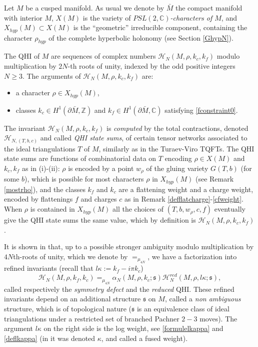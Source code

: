 \documentclass[11pt]{amsart}
\newcommand{\mc}{\mathbb{C}}
\newcommand{\mz}{\mathbb{Z}}
\newcommand{\Hh}{{\mathcal H}}
\begin{document}
{Let $M$ be a cusped manifold. As usual we denote by $\bar{M}$ the compact manifold with interior $M$, $X(M)$ is the variety of {\it $PSL(2,\mc)$-characters of $M$}, and $X_{hyp}(M) \subset X(M)$ is the ``geometric'' irreducible component, containing the character $\rho_{hyp}$ of the complete hyperbolic holonomy (see Section \ref{GhypN}).

The QHI of $M$ are sequences of complex numbers $\Hh_N(M, \rho,k_c,k_f)$ modulo multiplication by $2N$-th roots of unity, indexed by the odd positive integers $N\geq 3$. The arguments of $\Hh_N(M, \rho,k_c,k_f)$ are:
\begin{itemize}
	\item[(i)] a character $\rho\in X_{hyp}(M)$, 
	\item[(ii)] classes $k_c\in H^1(\partial \bar{M},\mz)$ and $k_f\in H^1(\partial \bar{M},\mc)$ satisfying \eqref{fconstraint0}. 
\end{itemize}
The invariant $\Hh_N(M, \rho,k_c,k_f)$ is {\it computed} by the total contractions, denoted $\Hh_{N, (T,b,c)}$ and called {\it QHI state sums},  of certain tensor networks associated to the ideal triangulations $T$ of $M$, similarly as in the Turaev-Viro TQFTs. The QHI state sums are functions of combinatorial data on $T$ encoding $\rho\in X(M)$ and $k_c,k_f$ as in (i)-(ii): $\rho$ is encoded by a point $w_\rho$ of the gluing variety $G(T,b)$ (for some $b$), which is possible for most characters $\rho$ in $X_{hyp}(M)$ (see Remark \ref{mostrho}), and the classes $k_f$ and $k_c$ are a flattening weight and a charge weight, encoded by flattenings $f$ and charges $c$ as in Remark \ref{defflatcharge}-\ref{cfweight}. When $\rho$ is contained in $X_{hyp}(M)$ all the choices of $(T,b,w_\rho,c,f)$ eventually give the QHI state sums the same value, which by definition is $\Hh_N(M, \rho,k_c,k_f)$.

It is shown in \cite{NA} that, up to a possible stronger ambiguity modulo multiplication by $4N$th-roots of unity, which we denote by $=_{\mu_{4N}}$, we have a factorization into refined invariants (recall that $l\kappa := k_f-i\pi k_c$)
\begin{equation}\label{factQHIalphared}
	\Hh_N(M,\rho,k_f,k_c) =_{\mu_{4N}} \alpha_N(M,\rho,k_c;\mathfrak{s})\Hh_N^{red}(M,\rho,l\kappa;\mathfrak{s}),
\end{equation}
called respectively the {\it symmetry defect} and the {\it reduced} QHI. These refined invariants depend on an additional structure $\mathfrak{s}$ on $M$, called a {\it non ambiguous} structure, which is of topological nature ($\mathfrak{s}$ is an equivalence class of ideal triangulations under a restricted set of branched Pachner $2-3$ moves). The argument $l\kappa$ on the right side is the log weight, see \eqref{formulelkappa} and \eqref{deflkappa} (in \cite{NA} it was denoted $\kappa$, and called a fused weight). 

}
\end{document}
